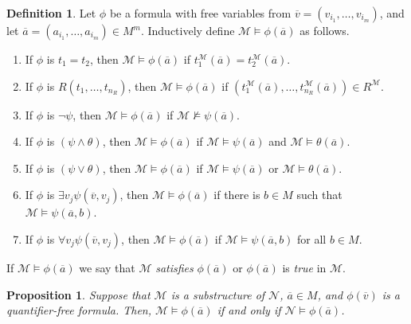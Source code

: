 \documentclass{amsart}
\newtheorem{proposition}[theorem]{Proposition}
\theoremstyle{definition}
\newtheorem{definition}[theorem]{Definition}
\numberwithin{equation}{section}
\begin{document}
\begin{definition}
  Let $\phi$ be a formula with free variables from
  $\overline{v} = (v_{i_1},\dots,v_{i_m})$, and let
  $\overline{a} = (a_{i_1},\dots,a_{i_m})\in M^m$.
  Inductively define \emph{$\mathcal{M} \models \phi(\overline{a})$} as follows.
  \begin{enumerate}[label = {\roman*)}]
    \item If $\phi$ is $t_1 = t_2$, then $\mathcal{M} \models \phi(\overline{a})$
      if $t_1^{\mathcal{M}}(\overline{a}) = t_2^{\mathcal{M}}(\overline{a})$.
    \item If $\phi$ is $R(t_1,\dots,t_{n_R})$, then $\mathcal{M} \models \phi(\overline{a})$
      if $(t^{\mathcal{M}}_1(\overline{a}),\dots,t^{\mathcal{M}}_{n_R}(\overline{a})) \in R^{\mathcal{M}}$.
    \item If $\phi$ is $\neg \psi$, then $\mathcal{M} \models \phi(\overline{a})$ if $\mathcal{M} \not\models \psi(\overline{a})$.
    \item If $\phi$ is $(\psi \land \theta)$, then $\mathcal{M} \models \phi(\overline{a})$
      if $\mathcal{M} \models \psi(\overline{a})$ and $\mathcal{M} \models \theta(\overline{a})$.
    \item If $\phi$ is $(\psi \lor \theta)$, then $\mathcal{M} \models \phi(\overline{a})$
      if $\mathcal{M} \models \psi(\overline{a})$ or $\mathcal{M} \models \theta(\overline{a})$.
    \item If $\phi$ is $\exists v_j \psi(\overline{v},v_j)$, then $\mathcal{M} \models \phi(\overline{a})$
      if there is $b \in M$ such that $\mathcal{M} \models \psi(\overline{a},b)$.
    \item If $\phi$ is $\forall v_j \psi(\overline{v},v_j)$,
      then $\mathcal{M} \models \phi(\overline{a})$ if $\mathcal{M} \models \psi(\overline{a},b)$ for all $b \in M$.
  \end{enumerate}
  If $\mathcal{M} \models \phi(\overline{a})$ we say that
  $\mathcal{M}$ \emph{satisfies} $\phi(\overline{a})$ or $\phi(\overline{a})$ is \emph{true} in $\mathcal{M}$.
\end{definition}

\begin{proposition}
  Suppose that $\mathcal{M}$ is a substructure of $\mathcal{N}$,
  $\overline{a} \in M$, and $\phi(\overline{v})$ is a quantifier-free formula.
  Then, $\mathcal{M} \models \phi(\overline{a})$ if and only if $\mathcal{N} \models \phi(\overline{a})$.
\end{proposition}
\end{document}
